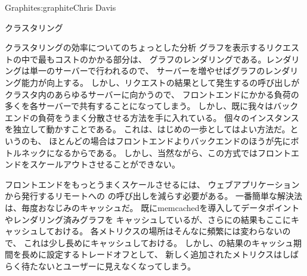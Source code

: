 \begin{aosachapter}{Graphite}{s:graphite}{Chris Davis}
\begin{aosasect1}{クラスタリング}
\begin{aosasect2}{クラスタリングの効率についてのちょっとした分析}
グラフを表示するリクエストの中で最もコストのかかる部分は、
グラフのレンダリングである。レンダリングは単一のサーバーで行われるので、
サーバーを増やせばグラフのレンダリング能力が向上する。
しかし、リクエストの結果として発生するの呼び出しが
クラスタ内のあらゆるサーバーに向かうので、
フロントエンドにかかる負荷の多くを各サーバーで共有することになってしまう。
しかし、既に我々はバックエンドの負荷をうまく分散させる方法を手に入れている。
個々のインスタンスを独立して動かすことである。
これは、はじめの一歩としてはよい方法だ。というのも、
ほとんどの場合はフロントエンドよりバックエンドのほうが先にボトルネックになるからである。
しかし、当然ながら、この方式ではフロントエンドをスケールアウトさせることができない。

フロントエンドをもっとうまくスケールさせるには、
ウェブアプリケーションから発行するリモートへの
の呼び出しを減らす必要がある。
一番簡単な解決法は、毎度おなじみのキャッシュだ。
既にmemcachedを導入してデータポイントやレンダリング済みグラフを
キャッシュしているが、さらにの結果もここにキャッシュしておける。
各メトリクスの場所はそんなに頻繁には変わらないので、
これは少し長めにキャッシュしておける。
しかし、の結果のキャッシュ期間を長めに設定するトレードオフとして、
新しく追加されたメトリクスはしばらく待たないとユーザーに見えなくなってしまう。


\end{aosasect2}
\end{aosasect1}
\end{aosachapter}
